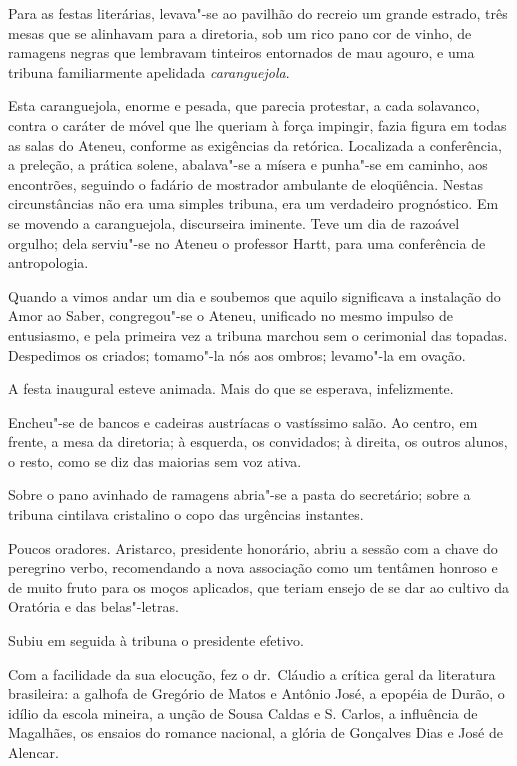 Para as festas literárias, levava"-se ao pavilhão do recreio um grande
estrado, três mesas que se alinhavam para a diretoria, sob um rico pano
cor de vinho, de ramagens negras que lembravam tinteiros entornados de
mau agouro, e uma tribuna familiarmente apelidada \textit{caranguejola}. 

Esta caranguejola, enorme e pesada, que parecia protestar, a cada solavanco,
contra o caráter de móvel que lhe queriam à força impingir, fazia
figura em todas as salas do Ateneu, conforme as exigências da retórica.
Localizada a conferência, a preleção, a prática solene, abalava"-se a
mísera e punha"-se em caminho, aos encontrões, seguindo o fadário de
mostrador ambulante de eloqüência. Nestas circunstâncias não era uma
simples tribuna, era um verdadeiro prognóstico. Em se movendo a
caranguejola, discurseira iminente. Teve um dia de razoável orgulho;
dela serviu"-se no Ateneu o professor Hartt, para uma conferência de
antropologia. 

Quando a vimos andar um dia e soubemos que aquilo
significava a instalação do Amor ao Saber, congregou"-se o Ateneu,
unificado no mesmo impulso de entusiasmo, e pela primeira vez a tribuna
marchou sem o cerimonial das topadas. Despedimos os criados;
tomamo"-la nós aos ombros; levamo"-la em ovação. 

A festa inaugural
esteve animada. Mais do que se esperava, infelizmente. 

Encheu"-se de
bancos e cadeiras austríacas o vastíssimo salão. Ao centro, em frente,
a mesa da diretoria; à esquerda, os convidados; à direita, os outros
alunos, o resto, como se diz das maiorias sem voz ativa. 

Sobre o pano
avinhado de ramagens abria"-se a pasta do secretário; sobre a tribuna
cintilava cristalino o copo das urgências instantes. 

Poucos oradores.
Aristarco, presidente honorário, abriu a sessão com a chave do
peregrino verbo, recomendando a nova associação como um tentâmen
honroso e de muito fruto para os moços aplicados, que teriam ensejo de
se dar ao cultivo da Oratória e das belas"-letras. 

Subiu em seguida à
tribuna o presidente efetivo. 

Com a facilidade da sua elocução, fez o
dr.~Cláudio a crítica geral da literatura brasileira: a galhofa de
Gregório de Matos e Antônio José, a epopéia de Durão, o idílio da
escola mineira, a unção de Sousa Caldas e S. Carlos, a influência de
Magalhães, os ensaios do romance nacional, a glória de Gonçalves Dias e
José de Alencar. 

